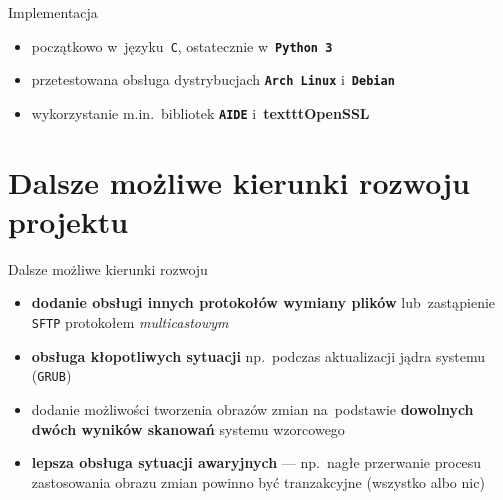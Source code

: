 \documentclass[notes,polish,xcolor=dvipsnames,aspectratio=169]{beamer}
\begin{document}
\begin{frame}{Implementacja}

\begin{itemize}
	\item początkowo w~języku~\texttt{C}, ostatecznie w~\textbf{\texttt{Python~3}}
	\item przetestowana obsługa dystrybucjach \textbf{\texttt{Arch Linux}} i~\textbf{\texttt{Debian}}
	\item wykorzystanie m.in.~bibliotek \textbf{\texttt{AIDE}} i~\textbf{texttt{OpenSSL}}
\end{itemize}

\end{frame}



\section{Dalsze możliwe kierunki rozwoju projektu}

\begin{frame}{Dalsze możliwe kierunki rozwoju}

\begin{itemize}
	\item \textbf{dodanie obsługi innych protokołów wymiany plików} lub~zastąpienie \texttt{SFTP} protokołem \emph{multicastowym}
	\item \textbf{obsługa kłopotliwych sytuacji} np.~podczas aktualizacji jądra systemu (\texttt{GRUB})
	\item dodanie możliwości tworzenia obrazów zmian na~podstawie \textbf{dowolnych dwóch wyników skanowań} systemu wzorcowego
	\item \textbf{lepsza obsługa sytuacji awaryjnych} --- np.~nagłe przerwanie procesu zastosowania obrazu zmian powinno być tranzakcyjne (wszystko albo nic)
\end{itemize}

\end{frame}
\end{document}
